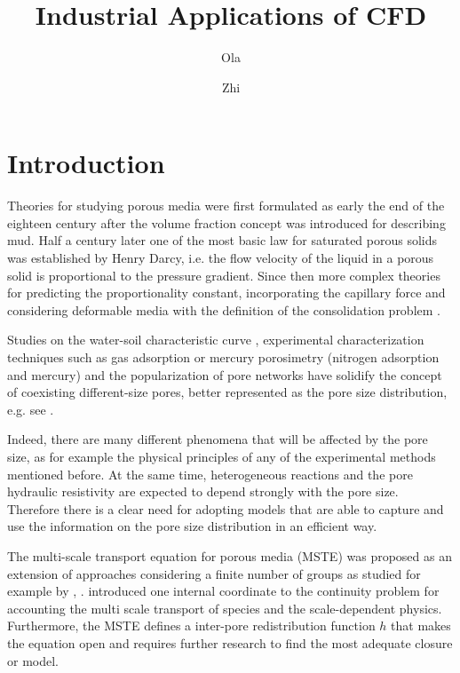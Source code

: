 \documentclass{CFD2011}
\title{Industrial Applications of CFD}
\author{Ola}{Nordmann} %
\author{Zhi}{L. Xie}
\begin{document}
\maketitle  %
\headers   %

\newpage

\section{Introduction}

Theories for studying porous media were first formulated as early the end of the eighteen century after the volume fraction concept was introduced for describing mud. Half a century later one of the most basic law for saturated porous solids was established by Henry Darcy, i.e. the flow velocity of the liquid in a porous solid is proportional to the pressure gradient. Since then more complex theories for predicting the proportionality constant, incorporating the capillary force and considering deformable media with the definition of the consolidation problem \citep{Boer1992}. 

Studies on the water-soil characteristic curve \citep{durner1994}, experimental characterization techniques such as gas adsorption or mercury porosimetry \citep{Navas,Jaroniec1997,Abell1999}(nitrogen adsorption and mercury) and the popularization of pore networks \citep{zhang1994, held2001, blunt2002, piri2005, ahrenholz2008, sholokhova2009} have solidify the concept of coexisting different-size pores, better represented as the pore size distribution, e.g. see \cite{dullien1991}.

Indeed, there are many different phenomena that will be affected by the pore size, as for example the physical principles of any of the experimental methods mentioned before. At the same time, heterogeneous reactions and the pore hydraulic resistivity are expected to depend strongly with the pore size. Therefore there is a clear need for adopting models that are able to capture and use the information on the pore size distribution in an efficient way.

The multi-scale transport equation for porous media (MSTE) was proposed as an extension of approaches considering a finite number of groups as studied for example by \cite{Chen1989}, \cite{bouffard2001}. \cite{DupuySchwarz} introduced one internal coordinate to the continuity problem for accounting the multi scale transport of species and the scale-dependent physics. Furthermore, the MSTE defines a inter-pore redistribution function $h$ that makes the equation open and requires further research to find the most adequate closure or model.
\end{document}
